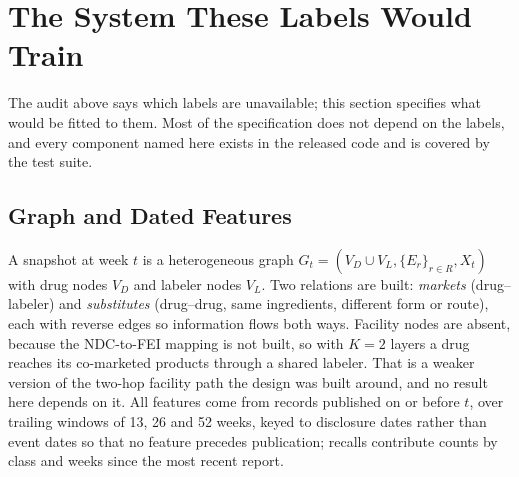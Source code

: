 \documentclass[conference,letterpaper]{IEEEtran}
\begin{document}
\section{The System These Labels Would Train}\label{sec:system}

The audit above says which labels are unavailable; this section specifies what
would be fitted to them. Most of the specification does not depend on the
labels, and every component named here exists in the released code and is
covered by the test suite.

\subsection{Graph and Dated Features}
A snapshot at week $t$ is a heterogeneous graph
$G_t=(V_D\cup V_L,\{E_r\}_{r\in R},X_t)$ with drug nodes $V_D$ and labeler
nodes $V_L$. Two relations are built: \emph{markets} (drug--labeler) and
\emph{substitutes} (drug--drug, same ingredients, different form or route),
each with reverse edges so information flows both ways. Facility nodes are
absent, because the NDC-to-FEI mapping is not built, so with $K=2$ layers a
drug reaches its co-marketed products through a shared labeler. That is a
weaker version of the two-hop facility path the design was built around, and no
result here depends on it. All features come from records published on or
before $t$, over trailing windows of 13, 26 and 52 weeks, keyed to disclosure
dates rather than event dates so that no feature precedes publication; recalls
contribute counts by class and weeks since the most recent report.
\end{document}
